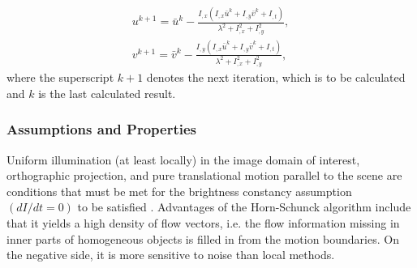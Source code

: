\documentclass[letterpaper,11pt]{article}
\begin{document}
\begin{subequations}
\begin{align}
u^{k+1} = \bar{u}^{k} - \frac{I_{,x} (I_{,x} \bar{u}^{k} + I_{,y} \bar{v}^{k} + I_{,t}) }{\lambda^2 + I_{,x}^2 + I_{,y}^2},\\
v^{k+1} = \bar{v}^{k} - \frac{I_{,y} (I_{,x} \bar{u}^{k} + I_{,y} \bar{v}^{k} + I_{,t}) }{\lambda^2 + I_{,x}^2 + I_{,y}^2},
\end{align}
\end{subequations}
where the superscript $k+1$ denotes the next iteration, which is to be calculated and $k$ is the last calculated result.
\subsubsection*{Assumptions and Properties}
Uniform illumination (at least locally) in the image domain of interest, orthographic projection, and pure translational motion parallel to the scene are conditions that must be met for the brightness constancy assumption $(dI / dt = 0)$ to be satisfied \citep{Beauchemin:1995}.
Advantages of the Horn-Schunck algorithm include that it yields a high density of flow vectors, i.e. the flow information missing in inner parts of homogeneous objects is filled in from the motion boundaries. On the negative side, it is more sensitive to noise than local methods.
\end{document}
